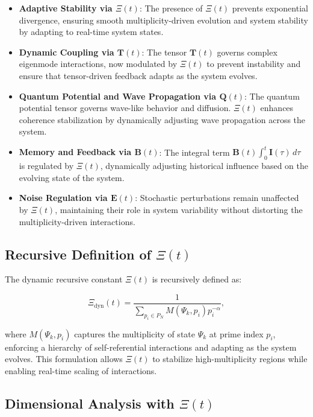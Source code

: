 \documentclass{article}
\theoremstyle{plain}
\begin{document}
\begin{itemize}
    \item \textbf{Adaptive Stability via \(\Xi(t) \)}: The presence of \(\Xi(t) \) prevents exponential divergence, ensuring smooth multiplicity-driven evolution and system stability by adapting to real-time system states.
    \item \textbf{Dynamic Coupling via \( \bm{T}(t) \)}: The tensor \( \bm{T}(t) \) governs complex eigenmode interactions, now modulated by \(\Xi(t) \) to prevent instability and ensure that tensor-driven feedback adapts as the system evolves.
    \item \textbf{Quantum Potential and Wave Propagation via \( \bm{Q}(t) \)}: The quantum potential tensor governs wave-like behavior and diffusion. \(\Xi(t) \) enhances coherence stabilization by dynamically adjusting wave propagation across the system.
    \item \textbf{Memory and Feedback via \( \bm{B}(t) \)}: The integral term \( \bm{B}(t) \int_0^t \bm{I}(\tau) \, d\tau \) is regulated by \(\Xi(t) \), dynamically adjusting historical influence based on the evolving state of the system.
    \item \textbf{Noise Regulation via \( \bm{E}(t) \)}: Stochastic perturbations remain unaffected by \(\Xi(t) \), maintaining their role in system variability without distorting the multiplicity-driven interactions.
\end{itemize}

\subsection{Recursive Definition of \(\Xi(t) \)}

The dynamic recursive constant \(\Xi(t) \) is recursively defined as:

\begin{equation}
\Xi_{\text{dyn}}(t) = \frac{1}{\sum_{p_i \in P_N} M(\Psi_k, p_i) p_i^{-\alpha}},
\end{equation}

where \( M(\Psi_k, p_i) \) captures the multiplicity of state \( \Psi_k \) at prime index \( p_i \), enforcing a hierarchy of self-referential interactions and adapting as the system evolves. This formulation allows \(\Xi(t) \) to stabilize high-multiplicity regions while enabling real-time scaling of interactions.

\subsection{Dimensional Analysis with \(\Xi(t) \)}
\end{document}
